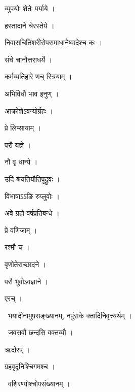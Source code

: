 \documentclass[10pt, openany, oneside]{book}
\begin{document}
\noindent व्युपयोः शेतेः पर्याये ।

\noindent हस्तादाने चेरस्तेये ।

\noindent निवासचितिशरीरोपसमाधानेष्वादेश्च कः ।

\noindent संघे चानौत्तराधर्ये ।

\noindent कर्मव्यतिहारे णच् स्त्रियाम् ।

\noindent अभिविधौ भाव इनुण् ।

\noindent आक्रोशेऽवन्योर्ग्रहः ।

\noindent प्रे लिप्सायाम् ।

\noindent परौ यज्ञे ।

\noindent नौ वृ धान्ये ।

\noindent उदि श्रयतियौतिपूद्रुवः ।

\noindent विभाषाऽऽङि रुप्लुवोः ।

\noindent अवे ग्रहो वर्षप्रतिबन्धे ।

\noindent प्रे वणिजाम् ।

\noindent रश्मौ च ।

\noindent वृणोतेराच्छादने ।

\noindent परौ भुवोऽवज्ञाने ।

\noindent एरच् ।

\par\noindent\hspace{1.5em}{\vps वा॰}~{\qt भयादीनामुपसङ्ख्यानम्, नपुंसके क्तादिनिवृत्त्यर्थम् ।}

\par\noindent\hspace{1.5em}{\vps वा॰}~{\qt जवसवौ छन्दसि वक्तव्यौ ।}

\noindent ऋदोरप् ।

\noindent ग्रहवृदृनिश्चिगमश्च ।

\par\noindent\hspace{1.5em}{\vps वा॰}~{\qt वशिरण्योश्चोपसंख्यानम् ।}
\end{document}
